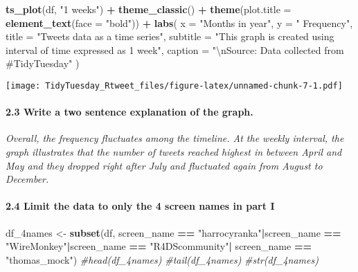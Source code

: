 \documentclass[]{article}
\newenvironment{Shaded}{\begin{snugshade}}{\end{snugshade}}
\newcommand{\CharTok}[1]{\textcolor[rgb]{0.31,0.60,0.02}{#1}}
\newcommand{\CommentTok}[1]{\textcolor[rgb]{0.56,0.35,0.01}{\textit{#1}}}
\newcommand{\DataTypeTok}[1]{\textcolor[rgb]{0.13,0.29,0.53}{#1}}
\newcommand{\KeywordTok}[1]{\textcolor[rgb]{0.13,0.29,0.53}{\textbf{#1}}}
\newcommand{\NormalTok}[1]{#1}
\newcommand{\OperatorTok}[1]{\textcolor[rgb]{0.81,0.36,0.00}{\textbf{#1}}}
\newcommand{\StringTok}[1]{\textcolor[rgb]{0.31,0.60,0.02}{#1}}
\let\oldparagraph\paragraph
\renewcommand{\paragraph}[1]{\oldparagraph{#1}\mbox{}}
\begin{document}
\begin{Shaded}
\begin{Highlighting}[]
\KeywordTok{ts_plot}\NormalTok{(df, }\StringTok{"1 weeks"}\NormalTok{) }\OperatorTok{+}\StringTok{ }\KeywordTok{theme_classic}\NormalTok{() }\OperatorTok{+}\StringTok{ }\KeywordTok{theme}\NormalTok{(}\DataTypeTok{plot.title =} \KeywordTok{element_text}\NormalTok{(}\DataTypeTok{face =} \StringTok{"bold"}\NormalTok{)) }\OperatorTok{+}\StringTok{ }\KeywordTok{labs}\NormalTok{(}
    \DataTypeTok{x =} \StringTok{"Months in year"}\NormalTok{, }\DataTypeTok{y =} \StringTok{" Frequency"}\NormalTok{,}
    \DataTypeTok{title =} \StringTok{"Tweets data as a time series"}\NormalTok{,}
    \DataTypeTok{subtitle =} \StringTok{"This graph is created using interval of time expressed as 1 week"}\NormalTok{,}
    \DataTypeTok{caption =} \StringTok{"}\CharTok{\textbackslash{}n}\StringTok{Source: Data collected from #TidyTuesday"}
\NormalTok{  )}
\end{Highlighting}
\end{Shaded}

\texttt{[image: TidyTuesday\_Rtweet\_files/figure-latex/unnamed-chunk-7-1.pdf]}

\hypertarget{write-a-two-sentence-explanation-of-the-graph.}{%
\paragraph{2.3 Write a two sentence explanation of the
graph.}\label{write-a-two-sentence-explanation-of-the-graph.}}

\emph{Overall, the frequency fluctuates among the timeline. At the
weekly interval, the graph illustrates that the number of tweets reached
highest in between April and May and they dropped right after July and
fluctuated again from August to December. }

\hypertarget{limit-the-data-to-only-the-4-screen-names-in-part-i}{%
\paragraph{2.4 Limit the data to only the 4 screen names in part
I}\label{limit-the-data-to-only-the-4-screen-names-in-part-i}}

\begin{Shaded}
\begin{Highlighting}[]
\NormalTok{df_4names <-}\StringTok{ }\KeywordTok{subset}\NormalTok{(df, screen_name }\OperatorTok{==}\StringTok{ "harrocyranka"}\OperatorTok{|}\NormalTok{screen_name }\OperatorTok{==}\StringTok{ "WireMonkey"}\OperatorTok{|}\NormalTok{screen_name }\OperatorTok{==}\StringTok{ "R4DScommunity"}\OperatorTok{|}\StringTok{ }\NormalTok{screen_name }\OperatorTok{==}\StringTok{ "thomas_mock"}\NormalTok{)}
\CommentTok{#head(df_4names)}
\CommentTok{#tail(df_4names)}
\CommentTok{#str(df_4names)}
\end{Highlighting}
\end{Shaded}
\end{document}
